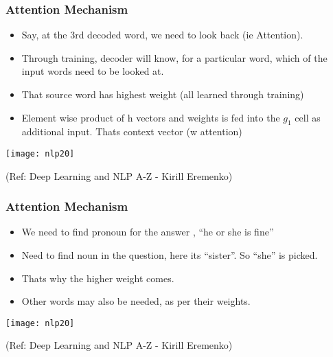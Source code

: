 \begin{frame}[fragile]\frametitle{Attention Mechanism}

\begin{itemize}
\item Say, at the 3rd decoded word, we need to look back (ie Attention).
\item Through training, decoder will know, for a particular word, which of the input words need to be looked at.
\item That source word has highest weight (all learned through training)
\item Element wise product of h vectors and weights is fed into the $g_1$ cell as additional input. Thats context vector (w attention)
\end{itemize}
\begin{center}
\texttt{[image: nlp20]}

\tiny{(Ref: Deep Learning and NLP A-Z - Kirill Eremenko)}
\end{center}

\end{frame}

\begin{frame}[fragile]\frametitle{Attention Mechanism}

\begin{itemize}
\item We need to find pronoun for the answer , ``he or she is fine''
\item Need to find noun in the question, here its ``sister''. So ``she'' is picked.
\item Thats why the higher weight comes.
\item Other words may also be needed, as per their weights.
\end{itemize}
\begin{center}
\texttt{[image: nlp20]}

\tiny{(Ref: Deep Learning and NLP A-Z - Kirill Eremenko)}
\end{center}

\end{frame}


